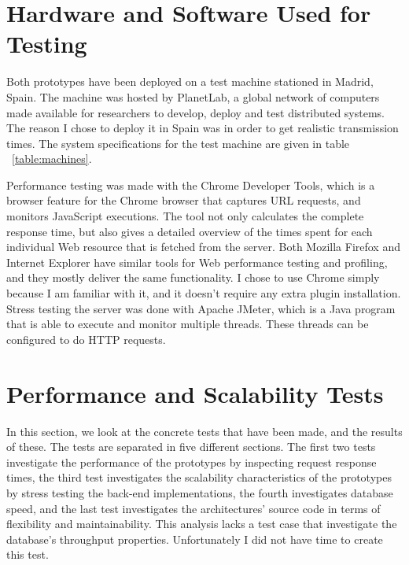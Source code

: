 \section{Hardware and Software Used for Testing}
Both prototypes have been deployed on a test machine stationed in Madrid, Spain. The machine was hosted by PlanetLab\cite{planetlab}, a global network of computers made available for researchers to develop, deploy and test distributed systems. The reason I chose to deploy it in Spain was in order to get realistic transmission times. The system specifications for the test machine are given in table ~\ref{table:machines}. 





Performance testing was made with the Chrome Developer Tools\cite{chrometool}, which is a browser feature for the Chrome browser\cite{chrome} that captures URL requests, and monitors JavaScript executions. The tool not only calculates the complete response time, but also gives a detailed overview of the times spent for each individual Web resource that is fetched from the server. Both Mozilla Firefox and Internet Explorer have similar tools for Web performance testing and profiling, and they mostly deliver the same functionality. I chose to use Chrome simply because I am familiar with it, and it doesn't require any extra plugin installation. 
Stress testing the server was done with Apache JMeter\cite{jmeter}, which is a Java program that is able to execute and monitor multiple threads. These threads can be configured to do HTTP requests.

\section{Performance and Scalability Tests}
In this section, we look at the concrete tests that have been made, and the results of these. The tests are separated in five different sections. The first two tests investigate the performance of the prototypes by inspecting request response times, the third test investigates the scalability characteristics of the prototypes by stress testing the back-end implementations, the fourth investigates database speed, and the last test investigates the architectures' source code in terms of flexibility and maintainability. This analysis lacks a test case that investigate the database's throughput properties. Unfortunately I did not have time to create this test. 

